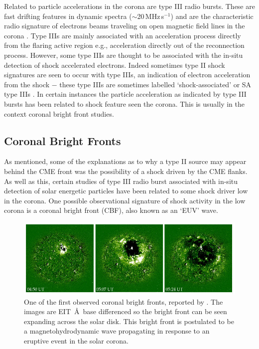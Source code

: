 Related to particle accelerations in the corona are type III radio bursts. These are fast drifting features in dynamic spectra ($\sim$20\,MHz\,s$^{-1}$) and are the characteristic radio signature of electrons beams traveling on open magnetic field lines in the corona \citep{pick2008}. Type IIIs are mainly associated with an acceleration process directly from the flaring active region e.g., acceleration directly out of the reconnection process. However, some type IIIs are thought to be associated with the in-situ detection of shock accelerated electrons. Indeed sometimes type II shock signatures are seen to occur with type IIIs, an indication of electron acceleration from the shock $-$ these type IIIs are sometimes labelled \textquoteleft shock-associated' or SA type IIIs \citep{bougeret1998}. In certain instances the particle acceleration as indicated by type III bursts has been related to shock feature seen the corona. This is usually in the context coronal bright front studies.

\subsection{Coronal Bright Fronts}
As mentioned, some of the explanations as to why a type II source may appear behind the CME front was the possibility of a shock driven by the CME flanks. As well as this, certain studies of type III radio burst associated with in-situ detection of solar energetic particles have been related to some shock driver low in the corona. One possible observational signature of shock activity in the low corona is a coronal bright front (CBF), also known as an \textquoteleft EUV' wave.
\begin{figure}[!t]
\begin{center}
\includegraphics[scale=0.5, trim=0cm 0cm 0cm 1cm]{images/eit_19970512_wave}
\caption[First observation of an \textquoteleft EIT wave']{One of the first observed coronal bright fronts, reported by \citep{thompson1998}. The images are EIT \,\AA\, base differenced so the bright front can be seen expanding across the solar disk. This bright front is postulated to be a magnetohydrodynamic wave propagating in response to an eruptive event in the solar corona.}
\label{fig:cbf}
\end{center}
\end{figure}

